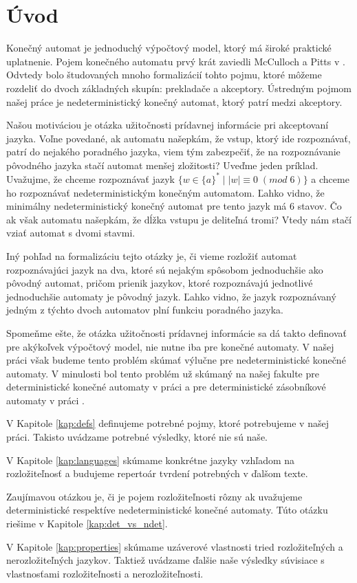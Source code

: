 \chapter*{Úvod}

Konečný automat je jednoduchý výpočtový model, ktorý má široké praktické uplatnenie. Pojem konečného automatu prvý krát zaviedli McCulloch a Pitts v \cite{McCullochPitts}. Odvtedy bolo študovaných mnoho formalizácií tohto pojmu, ktoré môžeme rozdeliť do dvoch základných skupín: prekladače a akceptory. Ústredným pojmom našej práce je nedeterministický konečný automat, ktorý patrí medzi akceptory.
\par
Našou motiváciou je otázka užitočnosti prídavnej informácie pri akceptovaní jazyka. Voľne povedané, ak automatu našepkám, že vstup, ktorý ide rozpoznávať, patrí do nejakého poradného jazyka, viem tým zabezpečiť, že na rozpoznávanie pôvodného jazyka stačí automat menšej zložitosti? Uveďme jeden príklad. Uvažujme, že chceme rozpoznávať jazyk $ \lbrace w \in \lbrace a \rbrace^* \; | \; |w| \equiv 0 \; (mod \; 6) \rbrace $ a chceme ho rozpoznávať nedeterministickým konečným automatom. Ľahko vidno, že minimálny nedeterministický konečný automat pre tento jazyk má 6 stavov. Čo ak však automatu našepkám, že dĺžka vstupu je deliteľná tromi? Vtedy nám stačí vziať automat s dvomi stavmi.
\par
Iný pohľad na formalizáciu tejto otázky je, či vieme rozložiť automat rozpoznávajúci jazyk na dva, ktoré sú nejakým spôsobom jednoduchšie ako pôvodný automat, pričom prienik jazykov, ktoré rozpoznávajú jednotlivé jednoduchšie automaty je pôvodný jazyk. Ľahko vidno, že jazyk rozpoznávaný jedným z týchto dvoch automatov plní funkciu poradného jazyka.
\par
Spomeňme ešte, že otázka užitočnosti prídavnej informácie sa dá takto definovať pre akýkoľvek výpočtový model, nie nutne iba pre konečné automaty. V našej práci však budeme tento problém skúmať výlučne pre nedeterministické konečné automaty. V minulosti bol tento problém už skúmaný na našej fakulte pre deterministické konečné automaty v práci \cite{Gazi} a pre deterministické zásobníkové automaty v práci \cite{Labath}.
\par
V Kapitole \ref{kap:defs} definujeme potrebné pojmy, ktoré potrebujeme v našej práci. Takisto uvádzame potrebné výsledky, ktoré nie sú naše.
\par
V Kapitole \ref{kap:languages} skúmame konkrétne jazyky vzhľadom na rozložiteľnosť a budujeme repertoár tvrdení potrebných v ďalšom texte.
\par
Zaujímavou otázkou je, či je pojem rozložiteľnosti rôzny ak uvažujeme deterministické respektíve nedeterministické konečné automaty. Túto otázku riešime v Kapitole \ref{kap:det_vs_ndet}.
\par
V Kapitole \ref{kap:properties} skúmame uzáverové vlastnosti tried rozložiteľných a nerozložiteľných jazykov. Taktiež uvádzame ďalšie naše výsledky súvisiace s vlastnosťami rozložiteľnosti a nerozložiteľnosti.